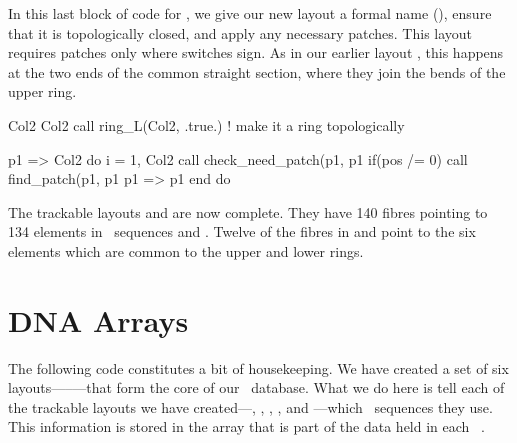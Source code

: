 %
In this last block of code for , we give our new layout a
formal name (), ensure that it is topologically
closed, and apply any necessary patches. This layout requires patches
only where  switches sign. As in our earlier
layout , this happens at the two ends of the common straight
section, where they join the bends of the upper ring.
%
\begin{ptccode}
Col2%
Col2%
call ring_L(Col2, .true.) ! make it a ring topologically

p1 => Col2%
do i = 1, Col2%
  call check_need_patch(p1, p1%
  if(pos /= 0) call find_patch(p1, p1%
  p1 => p1%
end do
\end{ptccode}

The trackable layouts  and  are now complete.
They have 140 fibres pointing to 134 elements in \DNA\ sequences
 and . Twelve of the fibres in  and
 point to the six elements which are common to the upper
and lower rings.


\section{DNA Arrays}
\label{sec:DNA.array}

%
The following code constitutes a bit of housekeeping. We have created a set of six layouts--------that form the core of our \DNA\ database. What we do here is tell each of the trackable layouts we have created---, , , , and ---which \DNA\ sequences they use. This information is stored in the array  that is part of the data held in each \PTC\ .

